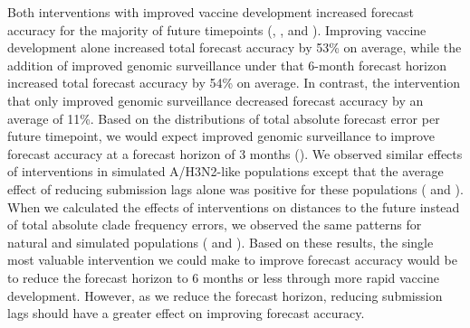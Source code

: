 \documentclass[9pt,lineno]{elife}
\begin{document}
\begin{table}[htb]
  \begin{center}
    
    \caption{Improvement in A/H3N2 clade frequency forecast accuracy under realistic interventions of improved vaccine development (reducing 12-month to 6-month forecast horizon), improved surveillance (reducing submission lags from 3 months on average to 1 month), or a combination of both interventions.
      We measured improvements from the status quo (12-month forecast horizon and 3-month average submission lag) as the difference in total absolute clade frequency error per future timepoint and the number and proportion of future timepoints for which forecasts improved under the intervention.}
    \label{tab:h3n2_effects_of_realistic_interventions}
  \end{center}
\end{table}

Both interventions with improved vaccine development increased forecast accuracy for the majority of future timepoints (, , and ).
Improving vaccine development alone increased total forecast accuracy by 53\% on average, while the addition of improved genomic surveillance under that 6-month forecast horizon increased total forecast accuracy by 54\% on average.
In contrast, the intervention that only improved genomic surveillance decreased forecast accuracy by an average of 11\%.
Based on the distributions of total absolute forecast error per future timepoint, we would expect improved genomic surveillance to improve forecast accuracy at a forecast horizon of 3 months ().
We observed similar effects of interventions in simulated A/H3N2-like populations except that the average effect of reducing submission lags alone was positive for these populations ( and ).
When we calculated the effects of interventions on distances to the future instead of total absolute clade frequency errors, we observed the same patterns for natural and simulated populations ( and ).
Based on these results, the single most valuable intervention we could make to improve forecast accuracy would be to reduce the forecast horizon to 6 months or less through more rapid vaccine development.
However, as we reduce the forecast horizon, reducing submission lags should have a greater effect on improving forecast accuracy.
\end{document}
